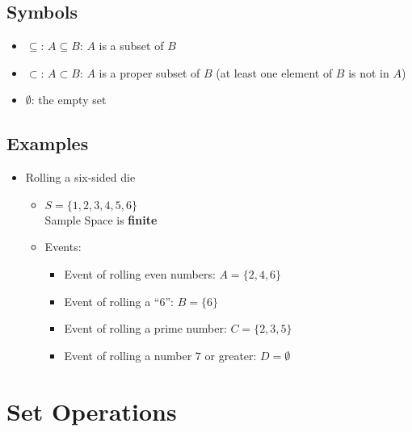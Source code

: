 \documentclass[12pt]{article}
\begin{document}
        \subsection{Symbols}
            \begin{itemize}
                \item $\subseteq$: $A \subseteq B$: $A$ is a subset of $B$
                \item $\subset$: $A \subset B$: $A$ is a proper subset of $B$ (at least one element of $B$ is not in $A$)
                \item $\emptyset$: the empty set
            \end{itemize}
        \subsection{Examples}
            \begin{itemize}
                \item Rolling a six-sided die
                    \begin{itemize}
                        \item $S = \{1, 2, 3, 4, 5, 6\}$
                        \\Sample Space is \textbf{finite}
                        \item Events:
                            \begin{itemize}
                                \item Event of rolling even numbers: $A = \{2, 4, 6\}$
                                \item Event of rolling a ``$6$'': $B = \{6\}$
                                \item Event of rolling a prime number: $C = \{2, 3, 5\}$
                                \item Event of rolling a number $7$ or greater: $D = \emptyset$
                            \end{itemize}
                    \end{itemize}
            \end{itemize}
    \section{Set Operations}
\end{document}
